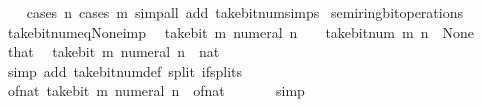 \begin{isabellebody}
%
\isadelimproof
\ \ %
\endisadelimproof
%
\isatagproof
{}\isamarkupfalse%
\ {\isacharparenleft}{\kern0pt}cases\ n{\isacharsemicolon}{\kern0pt}\ cases\ m{\isacharparenright}{\kern0pt}\ {\isacharparenleft}{\kern0pt}simp{\isacharunderscore}{\kern0pt}all\ add{\isacharcolon}{\kern0pt}\ take{\isacharunderscore}{\kern0pt}bit{\isacharunderscore}{\kern0pt}num{\isacharunderscore}{\kern0pt}simps{\isacharparenright}{\kern0pt}%
\endisatagproof
{\isafoldproof}%
%
\isadelimproof
\isanewline
%
\endisadelimproof
\isanewline
{}\isamarkupfalse%
\ semiring{\isacharunderscore}{\kern0pt}bit{\isacharunderscore}{\kern0pt}operations\isanewline
{}\isanewline
\isanewline
{}\isamarkupfalse%
\ take{\isacharunderscore}{\kern0pt}bit{\isacharunderscore}{\kern0pt}num{\isacharunderscore}{\kern0pt}eq{\isacharunderscore}{\kern0pt}None{\isacharunderscore}{\kern0pt}imp{\isacharcolon}{\kern0pt}\isanewline
\ \ {\isacartoucheopen}take{\isacharunderscore}{\kern0pt}bit\ m\ {\isacharparenleft}{\kern0pt}numeral\ n{\isacharparenright}{\kern0pt}\ {\isacharequal}{\kern0pt}\ {}{\isacartoucheclose}\ \ {\isacartoucheopen}take{\isacharunderscore}{\kern0pt}bit{\isacharunderscore}{\kern0pt}num\ m\ n\ {\isacharequal}{\kern0pt}\ None{\isacartoucheclose}\isanewline
%
\isadelimproof
%
\endisadelimproof
%
\isatagproof
{}\isamarkupfalse%
\ {\isacharminus}{\kern0pt}\isanewline
\ \ \isamarkupfalse%
\ that\ \isamarkupfalse%
\ {\isacartoucheopen}take{\isacharunderscore}{\kern0pt}bit\ m\ {\isacharparenleft}{\kern0pt}numeral\ n\ {\isacharcolon}{\kern0pt}{\isacharcolon}{\kern0pt}\ nat{\isacharparenright}{\kern0pt}\ {\isacharequal}{\kern0pt}\ {}{\isacartoucheclose}\isanewline
\ \ \ \ \isamarkupfalse%
\ {\isacharparenleft}{\kern0pt}simp\ add{\isacharcolon}{\kern0pt}\ take{\isacharunderscore}{\kern0pt}bit{\isacharunderscore}{\kern0pt}num{\isacharunderscore}{\kern0pt}def\ split{\isacharcolon}{\kern0pt}\ if{\isacharunderscore}{\kern0pt}splits{\isacharparenright}{\kern0pt}\isanewline
\ \ \isamarkupfalse%
\ \isamarkupfalse%
\ {\isacartoucheopen}of{\isacharunderscore}{\kern0pt}nat\ {\isacharparenleft}{\kern0pt}take{\isacharunderscore}{\kern0pt}bit\ m\ {\isacharparenleft}{\kern0pt}numeral\ n{\isacharparenright}{\kern0pt}{\isacharparenright}{\kern0pt}\ {\isacharequal}{\kern0pt}\ of{\isacharunderscore}{\kern0pt}nat\ {}{\isacartoucheclose}\isanewline
\ \ \ \ \isamarkupfalse%
\ simp\isanewline
\ \ \isamarkupfalse%

\end{isabellebody}
